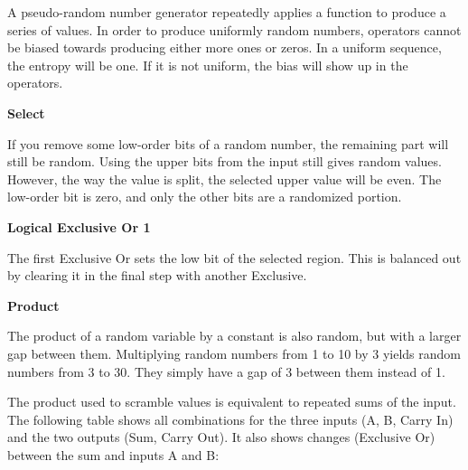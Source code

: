 \documentclass[preprint,natbib]{sigplanconf}
\begin{document}
A pseudo-random number generator repeatedly applies a function to produce a series of values. In order to produce uniformly random numbers, operators cannot be biased towards producing either more ones or zeros. In a uniform sequence, the entropy will be one. If it is not uniform, the bias will show up in the operators.

\textbf{Select}

If you remove some low-order bits of a random number, the remaining part will still be random. Using the upper bits from the input still gives random values. However, the way the value is split, the selected upper value will be even. The low-order bit is zero, and only the other bits are a randomized portion.

\textbf{Logical Exclusive Or 1}

The first Exclusive Or sets the low bit of the selected region. This is balanced out by clearing it in the final step with another Exclusive.

\textbf{Product}

The product of a random variable by a constant is also random, but with a larger gap between them. Multiplying random numbers from 1 to 10 by 3 yields random numbers from 3 to 30. They simply have a gap of 3 between them instead of 1.

The product used to scramble values is equivalent to repeated sums of the input. The following table shows all combinations for the three inputs (A, B, Carry In) and the two outputs (Sum, Carry Out). It also shows changes (Exclusive Or) between the sum and inputs A and B:
\end{document}

